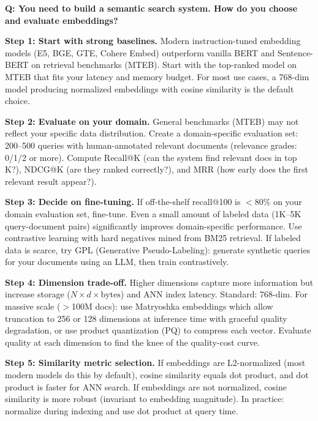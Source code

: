 \begin{interviewq}
\textbf{Q: You need to build a semantic search system. How do you choose and evaluate embeddings?}

 \quad {} \quad \badgefreq{\freqhigh}

\stronganswer

\textbf{Step 1: Start with strong baselines.} Modern instruction-tuned embedding models (E5, BGE, GTE, Cohere Embed) outperform vanilla BERT and Sentence-BERT on retrieval benchmarks (MTEB). Start with the top-ranked model on MTEB that fits your latency and memory budget. For most use cases, a 768-dim model producing normalized embeddings with cosine similarity is the default choice.

\textbf{Step 2: Evaluate on your domain.} General benchmarks (MTEB) may not reflect your specific data distribution. Create a domain-specific evaluation set: 200--500 queries with human-annotated relevant documents (relevance grades: 0/1/2 or more). Compute Recall@K (can the system find relevant docs in top K?), NDCG@K (are they ranked correctly?), and MRR (how early does the first relevant result appear?).

\textbf{Step 3: Decide on fine-tuning.} If off-the-shelf recall@100 is $<$80\% on your domain evaluation set, fine-tune. Even a small amount of labeled data (1K--5K query-document pairs) significantly improves domain-specific performance. Use contrastive learning with hard negatives mined from BM25 retrieval. If labeled data is scarce, try GPL (Generative Pseudo-Labeling): generate synthetic queries for your documents using an LLM, then train contrastively.

\textbf{Step 4: Dimension trade-off.} Higher dimensions capture more information but increase storage ($N \times d \times \text{bytes}$) and ANN index latency. Standard: 768-dim. For massive scale ($>$100M docs): use Matryoshka embeddings which allow truncation to 256 or 128 dimensions at inference time with graceful quality degradation, or use product quantization (PQ) to compress each vector. Evaluate quality at each dimension to find the knee of the quality-cost curve.

\textbf{Step 5: Similarity metric selection.} If embeddings are L2-normalized (most modern models do this by default), cosine similarity equals dot product, and dot product is faster for ANN search. If embeddings are not normalized, cosine similarity is more robust (invariant to embedding magnitude). In practice: normalize during indexing and use dot product at query time.


\end{interviewq}
